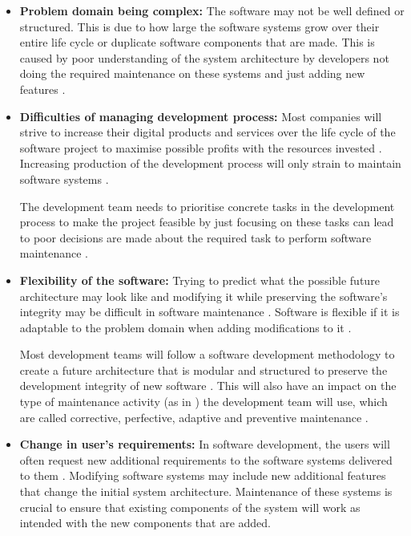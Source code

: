 \begin{itemize}
	\item \textbf{Problem domain being complex:} The software may not be well defined or structured. This is due to how large the software systems grow over their entire life cycle or duplicate software components that are made. This is caused by poor understanding of the system architecture by developers not doing the required maintenance on these systems and just adding new features \cite{Galster2019, Booch1986}.
	\item \textbf{Difficulties of managing development process:} Most companies will strive to increase their digital products and services over the life cycle of the software project to maximise possible profits with the resources invested \cite{Niu2018}. Increasing production of the development process will only strain to maintain software systems \cite{Sneed2004}.\par The development team needs to prioritise concrete tasks in the development process to make the project feasible by just focusing on these tasks can lead to poor decisions are made about the required task to perform software maintenance \cite{Galster2019, Ogheneovo2014, Lenarduzzi2017}. 
	\item \textbf{Flexibility of the software:} Trying to predict what the possible future architecture may look like and modifying it while preserving the software's integrity may be difficult in software maintenance \cite{Garlan1999}. Software is flexible if it is adaptable to the problem domain when adding modifications to it \cite{Ogheneovo2014}.\par Most development teams will follow a software development methodology to create a future architecture that is modular and structured to preserve the development integrity of new software \cite{Vijayasarathy2016, Rehman2018}. This will also have an impact on the type of maintenance activity (as in ) the development team will use, which are called corrective, perfective, adaptive and preventive maintenance \cite{FrancisThamburaj2017, Hasan2012, Stojanov2017, Snipes2018}.
	\item \textbf{Change in user's requirements:} In software development, the users will often request new additional requirements to the software systems delivered to them \cite{Ogheneovo2014}. Modifying software systems may include new additional features that change the initial system architecture. Maintenance of these systems is crucial to ensure that existing components of the system will work as intended with the new components that are added.
\end{itemize}

